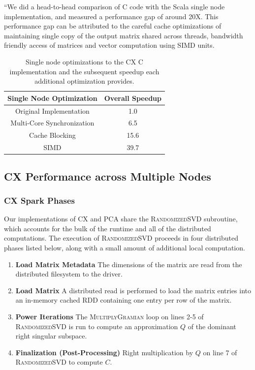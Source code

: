 “We did a head-to-head comparison of C code with the Scala single
 node implementation, and measured a performance gap of around 20X.
 This performance gap can be attributed to the careful cache
 optimizations of maintaining single copy of the output matrix shared
 across threads, bandwidth friendly access of matrices and vector
 computation using SIMD units.
 
  \begin{table}
  \begin{center}
  \begin{tabular}{ |c|c| } 
  \hline
  Single Node Optimization & Overall Speedup\\
  \hline
  Original Implementation & 1.0  \\
  Multi-Core Synchronization & 6.5 \\
  Cache Blocking & 15.6 \\
  SIMD & 39.7 \\
  \hline

  \end{tabular}
  \end{center}
  \caption{Single node optimizations to the CX C implementation and
  the subsequent speedup  each additional optimization provides.}
  \label{tab:single_node}
  \end{table}
 



  \subsection{CX Performance across Multiple Nodes}

  \subsubsection{CX Spark Phases}
  Our implementations of CX and PCA share the \textsc{RandomizedSVD} subroutine, which accounts for the bulk of the runtime and all of the distributed computations.
  The execution of \textsc{RandomizedSVD} proceeds in four distributed phases listed below, along with a small amount of additional local computation.
  \begin{enumerate}
      \item \textbf{Load Matrix Metadata}
         The dimensions of the matrix are read from the distributed filesystem to the driver.
      \item \textbf{Load Matrix}
         A distributed read is performed to load the matrix entries into an in-memory cached
         RDD containing one entry per row of the matrix.
      \item \textbf{Power Iterations}
         The \textsc{MultiplyGramian} loop on lines 2-5 of
         \textsc{RandomizedSVD} is run to compute an approximation $Q$
         of the dominant right singular subspace.
       \item \textbf{Finalization (Post-Processing)}
         Right multiplication by $Q$ on line 7 of \textsc{RandomizedSVD} to compute $C$.
  \end{enumerate}

